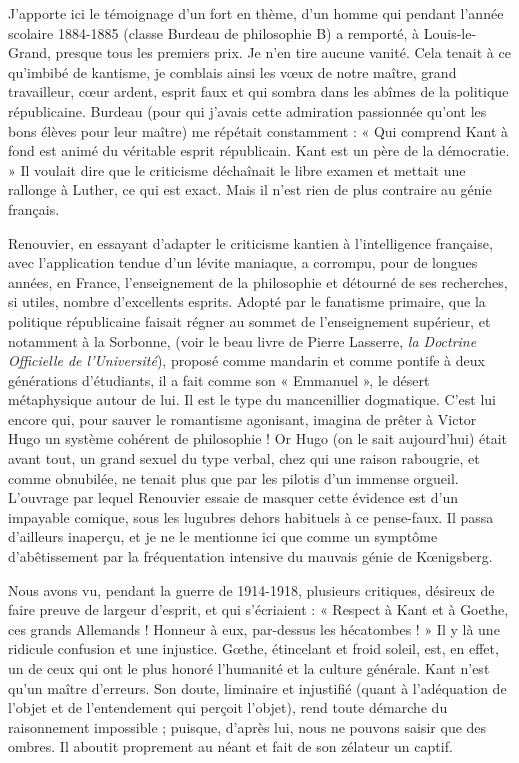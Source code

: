 \documentclass[french,twoside]{book} %
\begin{document}
J’apporte ici le témoignage d’un fort en thème, d’un homme qui pendant l’année scolaire 1884-1885 (classe Burdeau de philosophie B) a remporté, à Louis-le-Grand, presque tous les premiers prix. Je n’en tire aucune vanité. Cela tenait à ce qu’imbibé de kantisme, je comblais ainsi les vœux de notre maître, grand travailleur, cœur ardent, esprit faux et qui sombra dans les abîmes de la politique républicaine. Burdeau (pour qui j’avais cette admiration passionnée qu’ont les bons élèves pour leur maître) me répétait constamment : « Qui comprend Kant à fond est animé du véritable esprit républicain. Kant est un père de la démocratie. » Il voulait dire que le criticisme déchaînait le libre examen et mettait une rallonge à Luther, ce qui est exact. Mais il n’est rien de plus contraire au génie français.\par
Renouvier, en essayant d’adapter le criticisme kantien à l’intelligence française, avec l’application tendue d’un lévite maniaque, a corrompu, pour de longues années, en France, l’enseignement de la philosophie et détourné de ses recherches, si utiles, nombre d’excellents esprits. Adopté par le fanatisme primaire, que la politique républicaine faisait régner au sommet de l’enseignement supérieur, et notamment à la Sorbonne, (voir le beau livre de Pierre Lasserre, {\itshape la Doctrine Officielle de l’Université}), proposé comme mandarin et comme pontife à deux générations d’étudiants, il a fait comme son « Emmanuel », le désert métaphysique autour de lui. Il est le type du mancenillier dogmatique. C’est lui encore qui, pour sauver le romantisme agonisant, imagina de prêter à Victor Hugo un système cohérent de philosophie ! Or Hugo (on le sait aujourd’hui) était avant tout, un grand sexuel du type verbal, chez qui une raison rabougrie, et comme obnubilée, ne tenait plus que par les pilotis d’un immense orgueil. L’ouvrage par lequel Renouvier essaie de masquer cette évidence est d’un impayable comique, sous les lugubres dehors habituels à ce pense-faux. Il passa d’ailleurs inaperçu, et je ne le mentionne ici que comme un symptôme d’abêtissement par la fréquentation intensive du mauvais génie de Kœnigsberg.\par
Nous avons vu, pendant la guerre de 1914-1918, plusieurs critiques, désireux de faire preuve de largeur d’esprit, et qui s’écriaient : « Respect à Kant et à Goethe, ces grands Allemands ! Honneur à eux, par-dessus les hécatombes ! » Il y là une ridicule confusion et une injustice. Gœthe, étincelant et froid soleil, est, en effet, un de ceux qui ont le plus honoré l’humanité et la culture générale. Kant n’est qu’un maître d’erreurs. Son doute, liminaire et injustifié (quant à l’adéquation de l’objet et de l’entendement qui perçoit l’objet), rend toute démarche du raisonnement impossible ; puisque, d’après lui, nous ne pouvons saisir que des ombres. Il aboutit proprement au néant et fait de son zélateur un captif.\par
\end{document}
